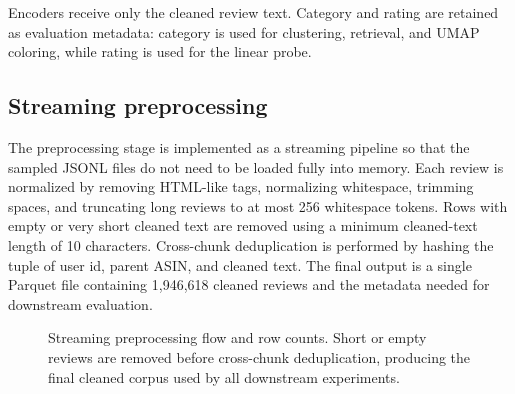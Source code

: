 \documentclass{article}
\begin{document}
Encoders receive only the cleaned review text. Category and rating are retained as evaluation metadata: category is used for clustering, retrieval, and UMAP coloring, while rating is used for the linear probe.

\subsection{Streaming preprocessing}
The preprocessing stage is implemented as a streaming pipeline so that the sampled JSONL files do not need to be loaded fully into memory. Each review is normalized by removing HTML-like tags, normalizing whitespace, trimming spaces, and truncating long reviews to at most 256 whitespace tokens. Rows with empty or very short cleaned text are removed using a minimum cleaned-text length of 10 characters. Cross-chunk deduplication is performed by hashing the tuple of user id, parent ASIN, and cleaned text. The final output is a single Parquet file containing 1,946,618 cleaned reviews and the metadata needed for downstream evaluation.

\begin{figure}[H]
\centering
{}
\caption{Streaming preprocessing flow and row counts. Short or empty reviews are removed before cross-chunk deduplication, producing the final cleaned corpus used by all downstream experiments.}
\label{fig:preprocess-flow}
\end{figure}
\end{document}
